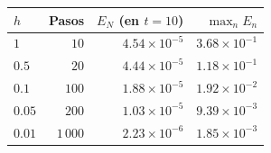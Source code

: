 \begin{tabular}{lrrr}
\toprule
$h$ & Pasos & $E_N$ (en $t = 10$) & $\max_n E_n$ \\
\midrule
$1$ & $10$ & $4.54 \times 10^{-5}$ & $3.68 \times 10^{-1}$ \\
$0.5$ & $20$ & $4.44 \times 10^{-5}$ & $1.18 \times 10^{-1}$ \\
$0.1$ & $100$ & $1.88 \times 10^{-5}$ & $1.92 \times 10^{-2}$ \\
$0.05$ & $200$ & $1.03 \times 10^{-5}$ & $9.39 \times 10^{-3}$ \\
$0.01$ & $1\,000$ & $2.23 \times 10^{-6}$ & $1.85 \times 10^{-3}$ \\
\bottomrule
\end{tabular}
